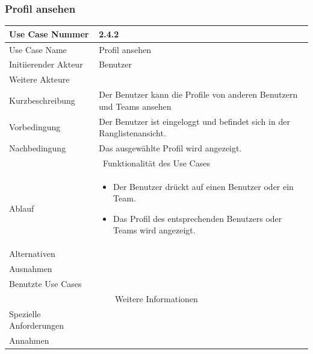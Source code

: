 \documentclass[10pt,a4paper]{article}
\begin{document}
\subsubsection{Profil ansehen}
	\begin{tabular}{|l|p{.5\linewidth}|}
	\hline Use Case Nummer & 2.4.2 \\ 
	\hline Use Case Name & Profil ansehen \\ 
	\hline Initiierender Akteur & Benutzer \\
	\hline Weitere Akteure &  \\
	\hline Kurzbeschreibung & Der Benutzer kann die Profile von anderen Benutzern und Teams ansehen \\
	\hline Vorbedingung & Der Benutzer ist eingeloggt und befindet sich in der Ranglistenansicht. \\
	\hline Nachbedingung & Das ausgewählte Profil wird angezeigt. \\
	\hline \multicolumn{2}{|c|}{Funktionalität des Use Cases}\\
	\hline Ablauf & \begin{itemize}
		\item Der Benutzer drückt auf einen Benutzer oder ein Team.
		\item Das Profil des entsprechenden Benutzers oder Teams wird angezeigt.
	\end{itemize} \\
	\hline Alternativen &  \\
	\hline Ausnahmen &  \\
	\hline Benutzte Use Cases &  \\
	\hline \multicolumn{2}{|c|}{Weitere Informationen} \\
	\hline Spezielle Anforderungen &  \\
	\hline Annahmen &  \\
	\hline
	\end{tabular}
\end{document}
